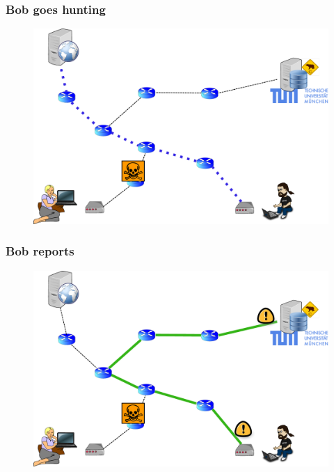 \begin{frame}
  \frametitle{Bob goes hunting}
  \begin{block}{}
    \vskip -1.2cm
    \begin{figure}[t]
      \centering
      \includegraphics[scale=.36]{figures/hunting-2-hunting}
    \end{figure}
  \end{block}
\end{frame}

\begin{frame}
  \frametitle{Bob reports}
  \begin{block}{}
    \vskip -1.2cm
    \begin{figure}[t]
      \centering
      \includegraphics[scale=.36]{figures/hunting-3-reporting}
    \end{figure}
  \end{block}
\end{frame}

